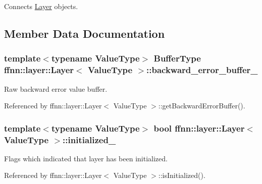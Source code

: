 Connects \hyperlink{classffnn_1_1layer_1_1_layer}{Layer} objects. 



\subsection{Member Data Documentation}
\hypertarget{classffnn_1_1layer_1_1_layer_a79d676e9b8bd04d1a438266206d4b321}{
\subsubsection[{backward\-\_\-error\-\_\-buffer\-\_\-}]{\setlength{\rightskip}{0pt plus 5cm}template$<$typename Value\-Type$>$ {\bf Buffer\-Type} {\bf ffnn\-::layer\-::\-Layer}$<$ Value\-Type $>$\-::backward\-\_\-error\-\_\-buffer\-\_\-\hspace{0.3cm}{\ttfamily [protected]}}}\label{classffnn_1_1layer_1_1_layer_a79d676e9b8bd04d1a438266206d4b321}


Raw backward error value buffer. 



Referenced by ffnn\-::layer\-::\-Layer$<$ Value\-Type $>$\-::get\-Backward\-Error\-Buffer().

\hypertarget{classffnn_1_1layer_1_1_layer_a4e353c2498ffed566076b3a7fd187e7b}{
\subsubsection[{initialized\-\_\-}]{\setlength{\rightskip}{0pt plus 5cm}template$<$typename Value\-Type$>$ bool {\bf ffnn\-::layer\-::\-Layer}$<$ Value\-Type $>$\-::initialized\-\_\-\hspace{0.3cm}{\ttfamily [protected]}}}\label{classffnn_1_1layer_1_1_layer_a4e353c2498ffed566076b3a7fd187e7b}


Flags which indicated that layer has been initialized. 



Referenced by ffnn\-::layer\-::\-Layer$<$ Value\-Type $>$\-::is\-Initialized().

